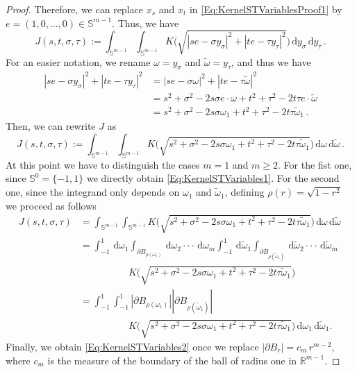 \documentclass[12pt,reqno]{amsart}
\theoremstyle{definition}
\theoremstyle{remark}
\newcommand{\con}[1]{\mathbb{#1}}
\newcommand{\R}{\con{R}} %
\newcommand{\Sph}{\con{S}} %
\renewcommand{\d}{\,\mathrm{d}} %
\numberwithin{equation}{section}
\begin{document}
\begin{proof}
		Therefore, we can replace $x_s$ and $x_t$ in \eqref{Eq:KernelSTVariablesProof1} by $e =(1,0,\ldots,0) \in \Sph^{m-1}$. Thus, we have
		\begin{equation*}
		J(s,t,\sigma, \tau) := \int_{\Sph^{m-1}}  \int_{\Sph^{m-1}} K\Big( \sqrt{|s e - \sigma y_\sigma|^2 + |t e - \tau y_\tau|^2 }\Big) \d y_\sigma \d y_\tau \,.
		\end{equation*}
		For an easier notation, we rename $\omega = y_\sigma$ and $\tilde\omega = y_\tau$, and thus we have
		\begin{align*}
		|s e - \sigma y_\sigma|^2 + |t e - \tau y_\tau|^2 &= |s e - \sigma \omega|^2 + |t e - \tau \tilde\omega|^2\\
		&= s^2 +\sigma^2 - 2 s \sigma e \cdot \omega + t^2 + \tau^2 - 2 t \tau e\cdot \tilde\omega \\
		&= s^2 +\sigma^2 - 2 s \sigma \omega_1 + t^2 + \tau^2 - 2t \tau\tilde\omega_1\,.
		\end{align*}
		Then, we can rewrite $J$ as
		\begin{equation*}
		\label{Eq:KernelSTVariablesProof3}
		J(s,t,\sigma, \tau) := \int_{\Sph^{m-1}}  \int_{\Sph^{m-1}} K\Big( \sqrt{s^2+\sigma^2- 2 s \sigma \omega_1 + t^2 + \tau^2 - 2t \tau\tilde\omega_1}\Big) \d \omega \d \tilde\omega \,.
		\end{equation*}
		At this point we have to distinguish the cases $m=1$ and $m\geq 2$. For the fist one, since
		$\Sph^{0} = \{-1,1\}$ we directly obtain \eqref{Eq:KernelSTVariables1}. For the second one,
		since the integrand only depends on $\omega_1$ and $\tilde\omega_1$, defining $\rho(r) = \sqrt{1-r^2}$ we proceed as follows
		\begin{align*}
		\label{Eq:KernelSTVariablesProof4}
		J(s,t,\sigma, \tau) &= \int_{\Sph^{m-1}}  \int_{\Sph^{m-1}} K\Big( \sqrt{s^2+\sigma^2- 2 s \sigma \omega_1 + t^2 + \tau^2 - 2t \tau\tilde\omega_1}\Big) \d \omega \d \tilde\omega \,\\
		&= \int_{-1}^1 \d \omega_1 \int_{\partial B_{\rho(\omega_1)}} \d \omega_2\cdot\cdot\cdot\d \omega_m \int_{-1}^1 \d \tilde\omega_1 \int_{\partial B_{\rho(\tilde\omega_1)}} \d \tilde\omega_2\cdot\cdot\cdot\d \tilde\omega_m  \\
		& \quad \quad \quad \quad \quad K\Big( \sqrt{s^2+\sigma^2- 2 s \sigma \omega_1 + t^2 + \tau^2 - 2t \tau\tilde\omega_1}\Big) \, \\
		&= \int_{-1}^1 \int_{-1}^1  |\partial B_{\rho(\omega_1)}| |\partial B_{\rho(\tilde\omega_1)}|\,\\
		& \quad \quad \quad \quad \quad K\Big( \sqrt{s^2+\sigma^2- 2 s \sigma \omega_1 + t^2 + \tau^2 - 2t \tau\tilde\omega_1}\Big) \d \omega_1 \d \tilde\omega_1 .
		\end{align*}
		Finally, we obtain \eqref{Eq:KernelSTVariables2} once we replace
		$|\partial B_{r}|=c_m\,r^{m-2}$, where $c_m$ is the measure of the boundary of the ball of radius one in
		$\R^{m-1}$.
	\end{proof}
	
\end{document}
